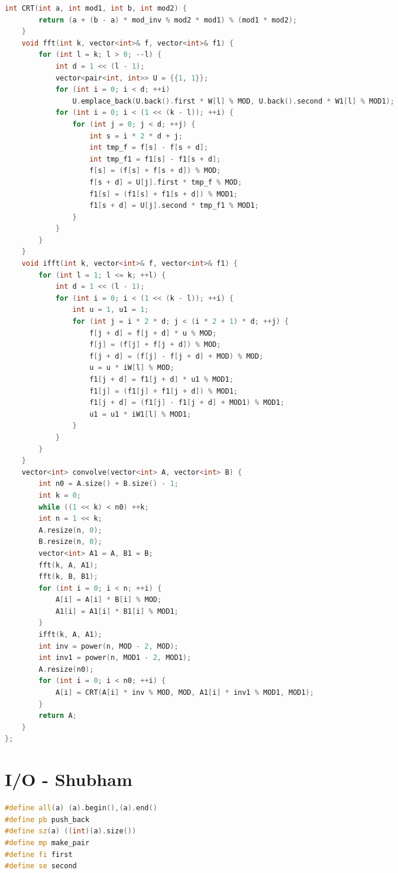 \documentclass[10pt,landscape, a4paper]{article}
\begin{document}
\begin{multicols*}{3}
\begin{lstlisting}[language=C++]
    int CRT(int a, int mod1, int b, int mod2) {
        return (a + (b - a) * mod_inv % mod2 * mod1) % (mod1 * mod2);
    }
    void fft(int k, vector<int>& f, vector<int>& f1) {
        for (int l = k; l > 0; --l) {
            int d = 1 << (l - 1);
            vector<pair<int, int>> U = {{1, 1}};
            for (int i = 0; i < d; ++i)
                U.emplace_back(U.back().first * W[l] % MOD, U.back().second * W1[l] % MOD1);
            for (int i = 0; i < (1 << (k - l)); ++i) {
                for (int j = 0; j < d; ++j) {
                    int s = i * 2 * d + j;
                    int tmp_f = f[s] - f[s + d];
                    int tmp_f1 = f1[s] - f1[s + d];
                    f[s] = (f[s] + f[s + d]) % MOD;
                    f[s + d] = U[j].first * tmp_f % MOD;
                    f1[s] = (f1[s] + f1[s + d]) % MOD1;
                    f1[s + d] = U[j].second * tmp_f1 % MOD1;
                }
            }
        }
    }
    void ifft(int k, vector<int>& f, vector<int>& f1) {
        for (int l = 1; l <= k; ++l) {
            int d = 1 << (l - 1);
            for (int i = 0; i < (1 << (k - l)); ++i) {
                int u = 1, u1 = 1;
                for (int j = i * 2 * d; j < (i * 2 + 1) * d; ++j) {
                    f[j + d] = f[j + d] * u % MOD;
                    f[j] = (f[j] + f[j + d]) % MOD;
                    f[j + d] = (f[j] - f[j + d] + MOD) % MOD;
                    u = u * iW[l] % MOD;
                    f1[j + d] = f1[j + d] * u1 % MOD1;
                    f1[j] = (f1[j] + f1[j + d]) % MOD1;
                    f1[j + d] = (f1[j] - f1[j + d] + MOD1) % MOD1;
                    u1 = u1 * iW1[l] % MOD1;
                }
            }
        }
    }
    vector<int> convolve(vector<int> A, vector<int> B) {
        int n0 = A.size() + B.size() - 1;
        int k = 0;
        while ((1 << k) < n0) ++k;
        int n = 1 << k;
        A.resize(n, 0);
        B.resize(n, 0);
        vector<int> A1 = A, B1 = B;
        fft(k, A, A1);
        fft(k, B, B1);
        for (int i = 0; i < n; ++i) {
            A[i] = A[i] * B[i] % MOD;
            A1[i] = A1[i] * B1[i] % MOD1;
        }
        ifft(k, A, A1);
        int inv = power(n, MOD - 2, MOD);
        int inv1 = power(n, MOD1 - 2, MOD1);
        A.resize(n0);
        for (int i = 0; i < n0; ++i) {
            A[i] = CRT(A[i] * inv % MOD, MOD, A1[i] * inv1 % MOD1, MOD1);
        }
        return A;
    }
};
\end{lstlisting}

\section{I/O - Shubham}
\begin{lstlisting}[language=C++]
#define all(a) (a).begin(),(a).end()
#define pb push_back
#define sz(a) ((int)(a).size())
#define mp make_pair
#define fi first
#define se second


\end{lstlisting}
\end{multicols*}
\end{document}
